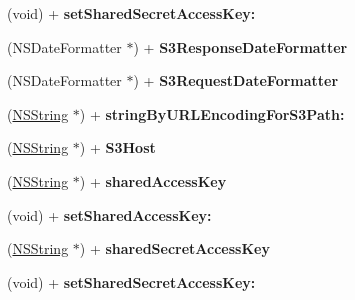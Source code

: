 \begin{DoxyCompactItemize}
\item 
\hypertarget{interface_a_s_i_s3_request_aca8ba2305c0cbee1d7ec8553831768ff}{
(void) + {\bfseries set\-Shared\-Secret\-Access\-Key\-:}}
\label{interface_a_s_i_s3_request_aca8ba2305c0cbee1d7ec8553831768ff}

\item 
\hypertarget{interface_a_s_i_s3_request_ac0d60115b59954ffcc2e293c60321a74}{
(\-N\-S\-Date\-Formatter $\ast$) + {\bfseries \-S3\-Response\-Date\-Formatter}}
\label{interface_a_s_i_s3_request_ac0d60115b59954ffcc2e293c60321a74}

\item 
\hypertarget{interface_a_s_i_s3_request_ac2da1def71701c5ed345a2e119dad803}{
(\-N\-S\-Date\-Formatter $\ast$) + {\bfseries \-S3\-Request\-Date\-Formatter}}
\label{interface_a_s_i_s3_request_ac2da1def71701c5ed345a2e119dad803}

\item 
\hypertarget{interface_a_s_i_s3_request_aab8bdd9f5d8970a3bcfca36ec9dee9fb}{
(\hyperlink{class_n_s_string}{\-N\-S\-String} $\ast$) + {\bfseries string\-By\-U\-R\-L\-Encoding\-For\-S3\-Path\-:}}
\label{interface_a_s_i_s3_request_aab8bdd9f5d8970a3bcfca36ec9dee9fb}

\item 
\hypertarget{interface_a_s_i_s3_request_ae49e83f64fb2490185d0a9ff3649e1d3}{
(\hyperlink{class_n_s_string}{\-N\-S\-String} $\ast$) + {\bfseries \-S3\-Host}}
\label{interface_a_s_i_s3_request_ae49e83f64fb2490185d0a9ff3649e1d3}

\item 
\hypertarget{interface_a_s_i_s3_request_aadbf1f29ab30efc3f4640bac7b508d32}{
(\hyperlink{class_n_s_string}{\-N\-S\-String} $\ast$) + {\bfseries shared\-Access\-Key}}
\label{interface_a_s_i_s3_request_aadbf1f29ab30efc3f4640bac7b508d32}

\item 
\hypertarget{interface_a_s_i_s3_request_ad944a2a1b20fc9e4559c8faf4f41b977}{
(void) + {\bfseries set\-Shared\-Access\-Key\-:}}
\label{interface_a_s_i_s3_request_ad944a2a1b20fc9e4559c8faf4f41b977}

\item 
\hypertarget{interface_a_s_i_s3_request_af1a72a1aacc05ce3f5def339d3bfbd5f}{
(\hyperlink{class_n_s_string}{\-N\-S\-String} $\ast$) + {\bfseries shared\-Secret\-Access\-Key}}
\label{interface_a_s_i_s3_request_af1a72a1aacc05ce3f5def339d3bfbd5f}

\item 
\hypertarget{interface_a_s_i_s3_request_aca8ba2305c0cbee1d7ec8553831768ff}{
(void) + {\bfseries set\-Shared\-Secret\-Access\-Key\-:}}
\label{interface_a_s_i_s3_request_aca8ba2305c0cbee1d7ec8553831768ff}


\end{DoxyCompactItemize}
